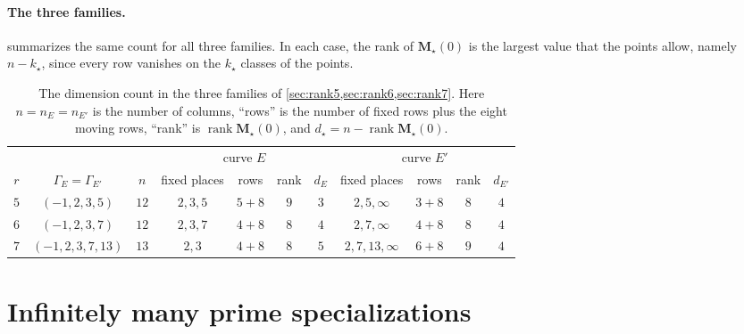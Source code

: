 \documentclass[12pt,oneside,openany]{book}
\theoremstyle{definition}
\theoremstyle{plain}
\numberwithin{equation}{chapter}
\theoremstyle{plain}
\theoremstyle{definition}
\theoremstyle{remark}
\DeclareMathOperator{\rk}{rank}
\begin{document}
\paragraph{The three families.}  summarizes the same count for all three families. In each case, the rank of $\mathbf M_\star(0)$ is the largest value that the points allow, namely $n-k_\star$, since every row vanishes on the $k_\star$ classes of the points.

\begin{table}[htbp]
\centering
\caption{The dimension count in the three families of \cref{sec:rank5,sec:rank6,sec:rank7}. Here $n=n_E=n_{E'}$ is the number of columns, ``rows'' is the number of fixed rows plus the eight moving rows, ``rank'' is $\rk\mathbf M_\star(0)$, and $d_\star=n-\rk\mathbf M_\star(0)$.}
\label{tab:overview-count}
\small
\setlength{\tabcolsep}{4.5pt}
\begin{tabular}{@{}ccccccccccc@{}}
\toprule
& & & \multicolumn{4}{c}{curve $E$} & \multicolumn{4}{c}{curve $E'$}\\
\cmidrule(lr){4-7}\cmidrule(lr){8-11}
$r$ & $\Gamma_E=\Gamma_{E'}$ & $n$ & fixed places & rows & rank & $d_E$ & fixed places & rows & rank & $d_{E'}$\\
\midrule
$5$ & $(-1,2,3,5)$ & $12$ & $2,3,5$ & $5+8$ & $9$ & $3$ & $2,5,\infty$ & $3+8$ & $8$ & $4$\\
$6$ & $(-1,2,3,7)$ & $12$ & $2,3,7$ & $4+8$ & $8$ & $4$ & $2,7,\infty$ & $4+8$ & $8$ & $4$\\
$7$ & $(-1,2,3,7,13)$ & $13$ & $2,3$ & $4+8$ & $8$ & $5$ & $2,7,13,\infty$ & $6+8$ & $9$ & $4$\\
\bottomrule
\end{tabular}
\end{table}

\section{Infinitely many prime specializations}\label{sec:overview-primes}
\end{document}

